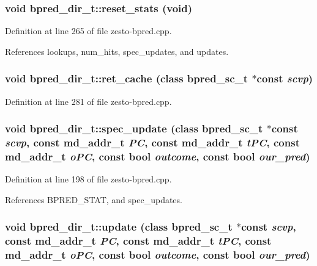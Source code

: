 \subsubsection[{reset\_\-stats}]{\setlength{\rightskip}{0pt plus 5cm}void bpred\_\-dir\_\-t::reset\_\-stats (void)\hspace{0.3cm}{\tt  [virtual]}}\label{classbpred__dir__t_3de25d231524346cf152a56110b962db}




Definition at line 265 of file zesto-bpred.cpp.

References lookups, num\_\-hits, spec\_\-updates, and updates.
\subsubsection[{ret\_\-cache}]{\setlength{\rightskip}{0pt plus 5cm}void bpred\_\-dir\_\-t::ret\_\-cache (class {\bf bpred\_\-sc\_\-t} $\ast$const  {\em scvp})\hspace{0.3cm}{\tt  [virtual]}}\label{classbpred__dir__t_f3515ecca72f2b35a35f53168beda0e3}




Definition at line 281 of file zesto-bpred.cpp.
\subsubsection[{spec\_\-update}]{\setlength{\rightskip}{0pt plus 5cm}void bpred\_\-dir\_\-t::spec\_\-update (class {\bf bpred\_\-sc\_\-t} $\ast$const  {\em scvp}, \/  const {\bf md\_\-addr\_\-t} {\em PC}, \/  const {\bf md\_\-addr\_\-t} {\em tPC}, \/  const {\bf md\_\-addr\_\-t} {\em oPC}, \/  const bool {\em outcome}, \/  const bool {\em our\_\-pred})\hspace{0.3cm}{\tt  [virtual]}}\label{classbpred__dir__t_5cc6a00701056ccfac14645b8f7d8d42}




Definition at line 198 of file zesto-bpred.cpp.

References BPRED\_\-STAT, and spec\_\-updates.
\subsubsection[{update}]{\setlength{\rightskip}{0pt plus 5cm}void bpred\_\-dir\_\-t::update (class {\bf bpred\_\-sc\_\-t} $\ast$const  {\em scvp}, \/  const {\bf md\_\-addr\_\-t} {\em PC}, \/  const {\bf md\_\-addr\_\-t} {\em tPC}, \/  const {\bf md\_\-addr\_\-t} {\em oPC}, \/  const bool {\em outcome}, \/  const bool {\em our\_\-pred})\hspace{0.3cm}{\tt  [virtual]}}\label{classbpred__dir__t_97de6b26c27583e4b50d6589239a6a70}




